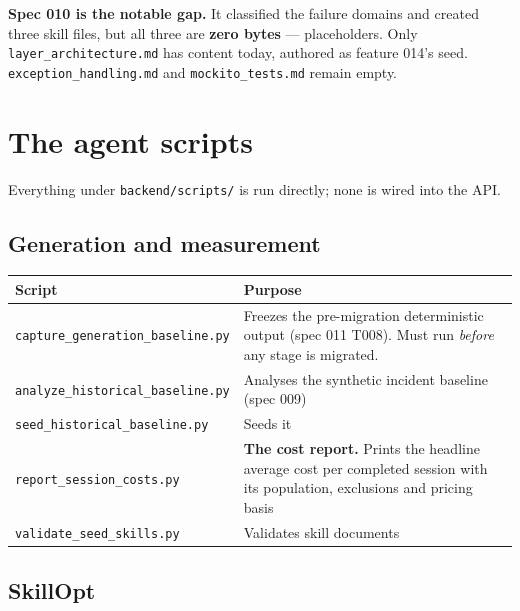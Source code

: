 \documentclass[11pt,a4paper]{article}
\begin{document}
\begin{notebox}
\textbf{Spec 010 is the notable gap.} It classified the failure domains and created
three skill files, but all three are \textbf{zero bytes} --- placeholders. Only
\texttt{layer\_architecture.md} has content today, authored as feature 014's seed.
\texttt{exception\_handling.md} and \texttt{mockito\_tests.md} remain empty.
\end{notebox}

\section{The agent scripts}

Everything under \texttt{backend/scripts/} is run directly; none is wired into the
API.

\subsection{Generation and measurement}

\begin{longtable}{@{}p{}p{}@{}}
\toprule
\textbf{Script} & \textbf{Purpose} \\
\midrule
\endhead
\texttt{capture\_generation\_baseline.py} & Freezes the pre-migration deterministic
output (spec 011 T008). Must run \emph{before} any stage is migrated. \\
\texttt{analyze\_historical\_baseline.py} & Analyses the synthetic incident baseline
(spec 009) \\
\texttt{seed\_historical\_baseline.py} & Seeds it \\
\texttt{report\_session\_costs.py} & \textbf{The cost report.} Prints the headline
average cost per completed session with its population, exclusions and pricing basis \\
\texttt{validate\_seed\_skills.py} & Validates skill documents \\
\bottomrule
\end{longtable}

\subsection{SkillOpt}
\end{document}
